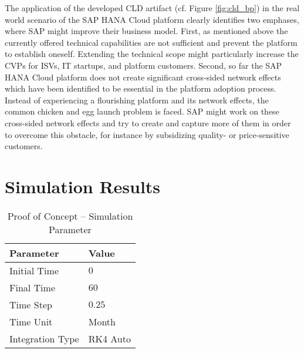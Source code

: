 The application of the developed \ac{CLD} artifact (cf. Figure \ref{fig:cld_bp}) in the real world scenario of the SAP HANA Cloud platform clearly identifies two emphases, where SAP might improve their business model. First, as mentioned above the currently offered technical capabilities are not sufficient and prevent the platform to establish oneself. Extending the technical scope might particularly increase the \acp{CVP} for \acp{ISV}, \ac{IT} startups, and platform customers. Second, so far the SAP HANA Cloud platform does not create significant cross-sided network effects which have been identified to be essential in the platform adoption process. Instead of experiencing a flourishing platform and its network effects, the common chicken and egg launch problem is faced. SAP might work on these cross-sided network effects and try to create and capture more of them in order to overcome this obstacle, for instance by subsidizing quality- or price-sensitive customers.

\section{Simulation Results}\label{ch:poc:sr}

\begin{table}[t]
	\centering
	\begin{tabular}{ll}
		\toprule 
		\footnotesize \textbf{Parameter} & \footnotesize \textbf{Value} \\ \midrule
		\footnotesize Initial Time & $0$ \\
		\footnotesize Final Time & $60$ \\
		\footnotesize Time Step & $0.25$ \\
		\footnotesize Time Unit & \footnotesize Month \\ \midrule
		\footnotesize Integration Type & \footnotesize RK4 Auto\footnotemark \\ \bottomrule
	\end{tabular}
	\caption{Proof of Concept -- Simulation Parameter}
	\label{tab:tb}
\end{table}


